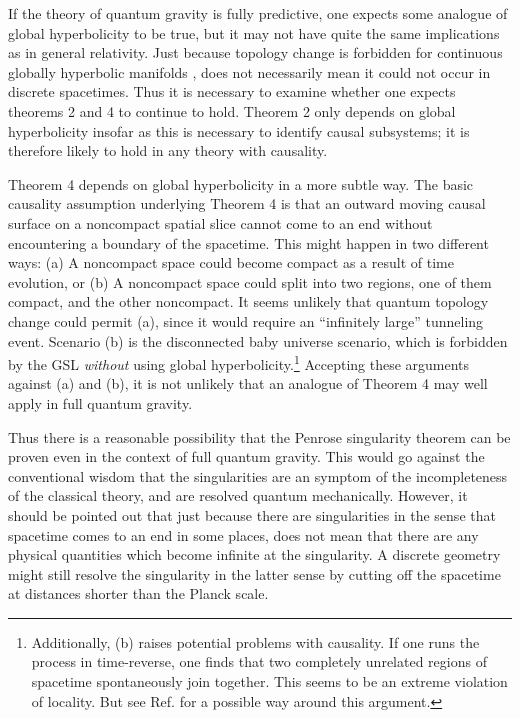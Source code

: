 \documentclass{article}
\begin{document}
If the theory of quantum gravity is fully predictive, one expects some analogue of global hyperbolicity to be true, but it may not have quite the same implications as in general relativity.  Just because topology change is forbidden for continuous globally hyperbolic manifolds \cite{geroch}, does not necessarily mean it could not occur in discrete spacetimes.  Thus it is necessary to examine whether one expects theorems 2 and 4 to continue to hold.  Theorem 2 only depends on global hyperbolicity insofar as this is necessary to identify causal subsystems; it is therefore likely to hold in any theory with causality.

Theorem 4 depends on global hyperbolicity in a more subtle way.  The basic causality assumption underlying Theorem 4 is that an outward moving causal surface on a noncompact spatial slice cannot come to an end without encountering a boundary of the spacetime.  This might happen in two different ways: (a) A noncompact space could become compact as a result of time evolution, or (b) A noncompact space could split into two regions, one of them compact, and the other noncompact.  It seems unlikely that quantum topology change could permit (a), since it would require an ``infinitely large'' tunneling event.  Scenario (b) is the disconnected baby universe scenario, which is forbidden by the GSL \emph{without} using global hyperbolicity.\footnote{Additionally, (b) raises potential problems with causality. If one runs the process in time-reverse, one finds that two completely unrelated regions of spacetime spontaneously join together.  This seems to be an extreme violation of locality.  But see Ref. \cite{coleman} for a possible way around this argument.}  Accepting these arguments against (a) and (b), it is not unlikely that an analogue of Theorem 4 may well apply in full quantum gravity.

Thus there is a reasonable possibility that the Penrose singularity theorem can be proven even in the context of full quantum gravity.  This would go against the conventional wisdom that the singularities are an symptom of the incompleteness of the classical theory, and are resolved quantum mechanically.  However, it should be pointed out that just because there are singularities in the sense that spacetime comes to an end in some places, does not mean that there are any physical quantities which become infinite at the singularity.  A discrete geometry might still resolve the singularity in the latter sense by cutting off the spacetime at distances shorter than the Planck scale.
\end{document}
